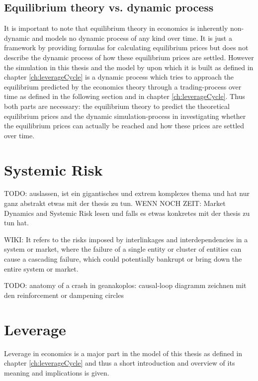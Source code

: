 \documentclass[../Bachelorarbeit.tex]{subfiles}
\begin{document}
\subsection{Equilibrium theory vs. dynamic process}
It is important to note that equilibrium theory in economics is inherently non-dynamic and models no dynamic process of any kind over time. It is just a framework by providing formulas for calculating equilibrium prices but does not describe the dynamic process of how these equilibrium prices are settled. However the simulation in this thesis and the model by \cite{Breuer2015} upon which it is built as defined in chapter \ref{ch:leverageCycle} is a dynamic process which tries to approach the equilibrium predicted by the economics theory through a trading-process over time as defined in the following section and in chapter \ref{ch:leverageCycle}.  Thus both parts are necessary: the equilibrium theory to predict the theoretical equilibrium prices and the dynamic simulation-process in investigating whether the equilibrium prices can actually be reached and how these prices are settled over time.



\section{Systemic Risk}
TODO: auslassen, ist ein gigantisches und extrem komplexes thema und hat nur ganz abstrakt etwas mit der thesis zu tun. WENN NOCH ZEIT: Market Dynamics and Systemic Risk lesen und falls es etwas konkretes mit der thesis zu tun hat.

WIKI: It refers to the risks imposed by interlinkages and interdependencies in a system or market, where the failure of a single entity or cluster of entities can cause a cascading failure, which could potentially bankrupt or bring down the entire system or market.

\cite{Milan2010}

TODO: anatomy of a crash in geanakoplos: causal-loop diagramm zeichnen mit den reinforcement or dampening circles

\section{Leverage}
Leverage in economics is a major part in the model of this thesis as defined in chapter \ref{ch:leverageCycle} and thus a short introduction and overview of its meaning and implications is given.
\end{document}

